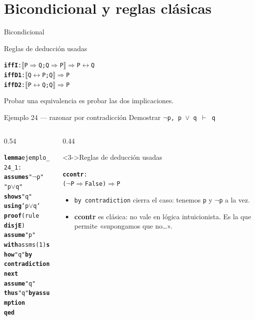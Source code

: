 \documentclass[11pt,aspectratio=169]{beamer}
\newcommand{\sOr}{\(\vee\)}
\newcommand{\sNot}{\(\neg\)}
\newcommand{\sIff}{\(\longleftrightarrow\)}
\newcommand{\sMeta}{\(\Longrightarrow\)}
\newcommand{\sTurn}{\(\vdash\)}
\newcommand{\sLb}{\(\llbracket\)}
\newcommand{\sRb}{\(\rrbracket\)}
\newcommand{\kw}[1]{\textcolor{isaCmd}{\textbf{#1}}}
\newcommand{\str}[1]{\textcolor{isaStr}{#1}}
\newcommand{\Rn}[1]{\textcolor{granate}{\textbf{#1}}}
\newcommand{\R}[1]{{\setlength{\fboxsep}{1pt}%
  \colorbox{resalte}{\ttfamily\bfseries\textcolor{granate}{#1}}}}
\begin{document}
\section{Bicondicional y reglas clásicas}

\begin{frame}[fragile]{Bicondicional}
  \begin{block}{Reglas de deducción usadas}
\begin{alltt}\footnotesize
\Rn{iffI}:  \sLb{}P \sMeta{} Q; Q \sMeta{} P\sRb{} \sMeta{} P \sIff{} Q
\Rn{iffD1}: \sLb{}Q \sIff{} P; Q\sRb{} \sMeta{} P
\Rn{iffD2}: \sLb{}P \sIff{} Q; Q\sRb{} \sMeta{} P
\end{alltt}
\end{block}
  
  \vfill
  \begin{center}
    Probar una equivalencia es probar \alert{las dos implicaciones}.
  \end{center}
\end{frame}

\begin{frame}[fragile]{Ejemplo 24 --- razonar por contradicción}
  Demostrar \quad \texttt{\sNot p,\; p \sOr{} q \;\sTurn{}\; q}
  \vspace{0.4em}
  
  \begin{columns}[T]
    \begin{column}{0.54\textwidth}
\begin{alltt}\footnotesize
\kw{lemma} ejemplo_24_1:
  \kw{assumes} \str{"\sNot p"}
          \str{"p \sOr{} q"}
  \kw{shows} \str{"q"}
\kw{using} `p \sOr{} q`
\kw{proof} (rule \R{disjE})
  \kw{assume} \str{"p"}
  \kw{with} assms(1) \kw{show} \str{"q"} \kw{by} \R{contradiction}
\kw{next}
  \kw{assume} \str{"q"}
  \kw{thus} \str{"q"} \kw{by} \kw{assumption}
\kw{qed}
\end{alltt}
    \end{column}
    \begin{column}{0.44\textwidth}
      \begin{block}<3->{Reglas de deducción usadas}
\begin{alltt}\scriptsize
\Rn{ccontr}:
  (\sNot P \sMeta{} False) \sMeta{} P
\end{alltt}
\end{block}
      \footnotesize
      \begin{itemize}
        \item<4-> \texttt{by contradiction} cierra el caso: tenemos
          \texttt{p} y \texttt{\sNot p} a la vez.
        \item<5-> \alert{\Rn{ccontr} es clásica}: no vale en lógica
          intuicionista. Es la que permite «supongamos que no\ldots».
      \end{itemize}
    \end{column}
  \end{columns}
\end{frame}
\end{document}
